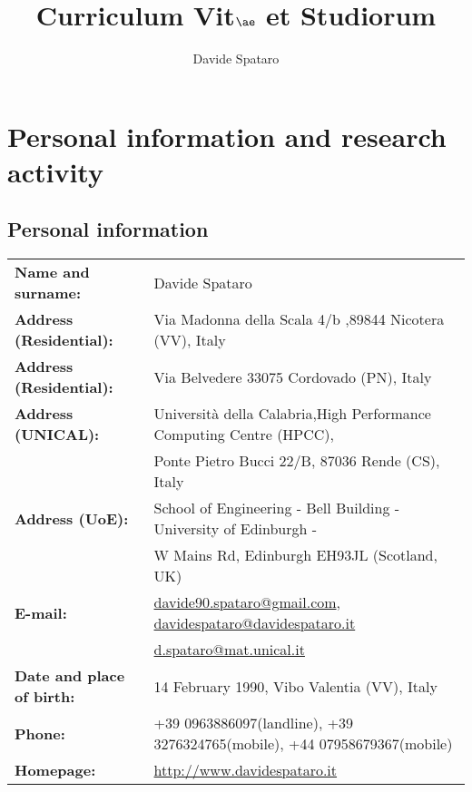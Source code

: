 \documentclass[a4paper,10pt]{article}
\title{Curriculum Vit$\ae$ et Studiorum}
\author{Davide Spataro}
\begin{document}
\maketitle

\tableofcontents

\newpage

\section{Personal information and research activity}

\subsection{Personal information}

\begin{table}[h]
\begin{tabular}{l l}
\textbf{Name and surname:} & Davide Spataro \\
\textbf{Address (Residential):} & Via Madonna della Scala 4/b ,89844 Nicotera
(VV), Italy \\
\textbf{Address (Residential):} & Via Belvedere 33075 Cordovado (PN), Italy
\\
\textbf{Address (UNICAL):} & Universit\`a della Calabria,High Performance
Computing Centre (HPCC),\\&  Ponte Pietro Bucci 22/B, 87036 Rende (CS),
Italy
\\
\textbf{Address (UoE):} & School of Engineering  - Bell Building -  University
of Edinburgh -\\
& W Mains Rd, Edinburgh EH93JL (Scotland, UK)
\\
\textbf{E-mail:} &
\href{mailto:davide90.spataro@gmail.com}{davide90.spataro@gmail.com},
\href{mailto:davidespataro@davidespataro.it}{davidespataro@davidespataro.it}\\&
\href{mailto:d.spataro@mat.unical.it}{d.spataro@mat.unical.it}
\\
\textbf{Date and place of birth:} & 14 February 1990, Vibo Valentia (VV),
Italy \\
\textbf{Phone: }& +39 0963886097(landline), +39 3276324765(mobile),
+44 07958679367(mobile) \\
\textbf{Homepage: }& \url{http://www.davidespataro.it} \\
\end{tabular}
\end{table}

\begin{center}
\mbox{}
\end{center}
 
\end{document}
